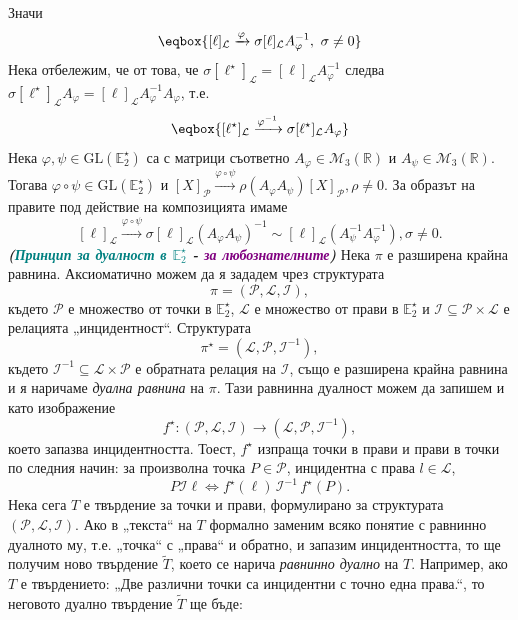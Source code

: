 \documentclass[12pt]{article}
\begin{document}
Значи $$\eqbox{\textcolor{black}{[\ell]_{\mathcal L}\xrightarrow{\varphi}\sigma[\ell]_{\mathcal{L}} A_{\varphi}^{-1},\ \sigma\neq 0}}$$
Нека отбележим, че от това, че $\sigma[\ell^\star]_{\mathcal L}=[\ell]_{\mathcal L} A_{\varphi}^{-1}$ следва $\sigma[\ell^\star]_{\mathcal L} A_{\varphi}=[\ell]_{\mathcal L} A_{\varphi}^{-1} A_{\varphi}$, т.е. $$\eqbox{[\ell^\star]_{\mathcal L}\xrightarrow{\varphi^{-1}}\sigma[\ell^\star]_{\mathcal L} A_{\varphi}}$$
Нека $\varphi,\psi\in\mathrm{GL}(\mathbb{E}_2^\star)$ са с матрици съответно $A_\varphi\in\mathcal M_3(\mathbb{R})$ и $A_\psi\in\mathcal M_3(\mathbb{R})$. Тогава $\varphi\circ\psi\in\mathrm{GL}(\mathbb{E}_2^\star)$ и $[X]_{\mathcal{P}}\xrightarrow{\varphi\circ\psi}\rho (A_\varphi A_\psi)[X]_{\mathcal{P}}, \rho\neq 0$. За образът на правите под действие на композицията имаме $$[\ell]_{\mathcal{L}}\xrightarrow{\varphi\circ\psi}\sigma [\ell]_{\mathcal{L}}(A_\varphi A_\psi)^{-1}\sim[\ell]_{\mathcal{L}}(A_\psi^{-1} A_\varphi^{-1}), \sigma\neq 0.$$
\textbf{\textit{(\textcolor{teal}{Принцип за дуалност в $\mathbb{E}_2^\star$} - \textcolor{purple}{за любознателните})}} Нека $\pi$ е разширена крайна равнина. Аксиоматично можем да я зададем
чрез структурата
\[
\pi = (\mathcal P, \mathcal L, \mathcal I),
\]
където $\mathcal P$ е множество от точки в $\mathbb{E}_2^\star$,
$\mathcal L$ е множество от прави в $\mathbb{E}_2^\star$ и
$\mathcal I \subseteq \mathcal P \times \mathcal L$
е релацията „инцидентност“. Структурата
\[
\pi^\star = (\mathcal L, \mathcal P, \mathcal I^{-1}),
\]
където $\mathcal I^{-1} \subseteq \mathcal L \times \mathcal P$
е обратната релация на $\mathcal I$, също е разширена крайна равнина
и я наричаме \emph{дуална равнина} на $\pi$.
Тази равнинна дуалност можем да запишем и като изображение
\[
f^\star : (\mathcal P, \mathcal L, \mathcal I) \to (\mathcal L, \mathcal P, \mathcal I^{-1}),
\]
което запазва инцидентността.
Тоест, $f^\star$ изпраща точки в прави и прави в точки по следния начин:
за произволна точка $P \in \mathcal P$, инцидентна с права $l \in \mathcal L$,
\[
P \mathcal I \ell \iff f^\star(\ell)\,\mathcal I^{-1}\, f^\star(P).
\]
Нека сега $T$ е твърдение за точки и прави, формулирано за структурата
$(\mathcal P, \mathcal L, \mathcal I)$.
Ако в „текста“ на $T$ формално заменим всяко понятие
с равнинно дуалното му, т.е. „точка“ с „права“ и обратно,
и запазим инцидентността, то ще получим ново твърдение $\tilde T$,
което се нарича \emph{равнинно дуално} на $T$. Например, ако $T$ е твърдението:
„Две различни точки са инцидентни с точно една права.“,
то неговото дуално твърдение $\tilde T$ ще бъде:
\end{document}
